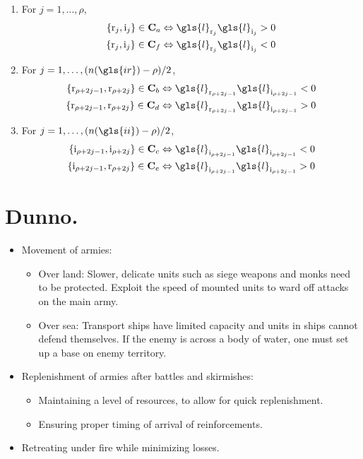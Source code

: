 \documentclass{article}
\begin{document}
\begin{enumerate}
\label{list:class}
\item For $j = 1, \dots, \rho$,
\begin{align}
\left\lbrace \mathrm{r}_j, \mathrm{i}_j\right\rbrace \in \mathbf{C}_a 
&\Leftrightarrow \gls{l}_{\mathrm{r}_j}\gls{l}_{\mathrm{i}_j} > 0\\
\left\lbrace \mathrm{r}_j, \mathrm{i}_j\right\rbrace \in \mathbf{C}_f 
&\Leftrightarrow \gls{l}_{\mathrm{r}_j}\gls{l}_{\mathrm{i}_j} < 0
\end{align}
\item For $j = 1, \dots, (n(\gls{ir}) - \rho)/2$,
\begin{align}
\left\lbrace \mathrm{r}_{\rho+2j-1}, \mathrm{r}_{\rho+2j}\right\rbrace \in \mathbf{C}_b
&\Leftrightarrow \gls{l}_{\mathrm{r}_{\rho+2j-1}}\gls{l}_{\mathrm{i}_{\rho+2j-1}} < 0\\
\left\lbrace \mathrm{r}_{\rho+2j-1}, \mathrm{r}_{\rho+2j}\right\rbrace \in \mathbf{C}_d
&\Leftrightarrow \gls{l}_{\mathrm{r}_{\rho+2j-1}}\gls{l}_{\mathrm{i}_{\rho+2j-1}} > 0
\end{align}
\item For $j = 1, \dots, (n(\gls{ii}) - \rho)/2$,
\begin{align}
\left\lbrace \mathrm{i}_{\rho+2j-1}, \mathrm{i}_{\rho+2j}\right\rbrace \in \mathbf{C}_c
&\Leftrightarrow \gls{l}_{\mathrm{i}_{\rho+2j-1}}\gls{l}_{\mathrm{i}_{\rho+2j-1}} < 0\\
\left\lbrace \mathrm{i}_{\rho+2j-1}, \mathrm{r}_{\rho+2j}\right\rbrace \in \mathbf{C}_e
&\Leftrightarrow \gls{l}_{\mathrm{i}_{\rho+2j-1}}\gls{l}_{\mathrm{i}_{\rho+2j-1}} > 0
\end{align}
\end{enumerate}


\section{Dunno.}
\begin{itemize}
	\item Movement of armies:
	\begin{itemize}
		\item Over land:	Slower, delicate units such as siege weapons and 
		monks need to be protected. Exploit the speed of mounted units to 
		ward off attacks on the main army.
		\item Over sea:	Transport ships have limited capacity and units 
		in ships cannot defend themselves. If the enemy is across a body 
		of water, one must set up a base on enemy territory. 
	\end{itemize}
	\item Replenishment of armies after battles and skirmishes:
	\begin{itemize}
		\item Maintaining a level of resources, to allow for 
		quick replenishment.
		\item Ensuring proper timing of arrival of reinforcements.
	\end{itemize}
	\item Retreating under fire while minimizing losses.
\end{itemize}
\end{document}
